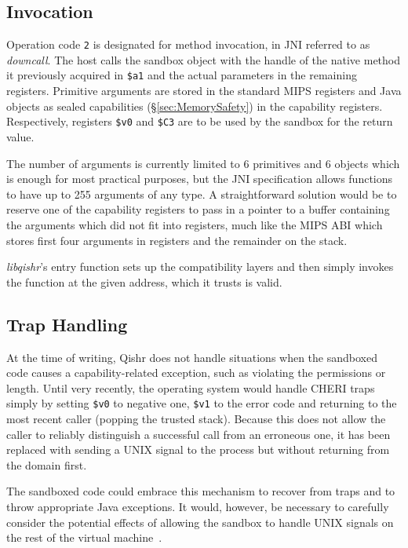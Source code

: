 \documentclass[a4paper,12pt,twoside,openright]{report}
\newcommand{\reg}[1]{\texttt{\$#1}}
\newcommand{\tool}[1]{\emph{#1}}
\newcommand{\lib}[1]{\tool{lib#1}}
\begin{document}
\subsection{Invocation}

Operation code \texttt{2} is designated for method invocation, in JNI referred to as \emph{downcall}. The host calls the sandbox object with the handle of the native method it previously acquired in \reg{a1} and the actual parameters in the remaining registers. Primitive arguments are stored in the standard MIPS registers and Java objects as sealed capabilities (\S\ref{sec:MemorySafety}) in the capability registers. Respectively, registers \reg{v0} and \reg{C3} are to be used by the sandbox for the return value.

The number of arguments is currently limited to 6 primitives and 6 objects which is enough for most practical purposes, but the JNI specification allows functions to have up to 255 arguments of any type. A straightforward solution would be to reserve one of the capability registers to pass in a pointer to a buffer containing the arguments which did not fit into registers, much like the MIPS ABI which stores first four arguments in registers and the remainder on the stack.

\lib{qishr}'s entry function sets up the compatibility layers and then simply invokes the function at the given address, which it trusts is valid. 

\subsection{Trap Handling}

At the time of writing, Qishr does not handle situations when the sandboxed code causes a capability-related exception, such as violating the permissions or length. Until very recently, the operating system would handle CHERI traps simply by setting \reg{v0} to negative one, \reg{v1} to the error code and returning to the most recent caller (popping the trusted stack). Because this does not allow the caller to reliably distinguish a successful call from an erroneous one, it has been replaced with sending a UNIX signal to the process but without returning from the domain first.

The sandboxed code could embrace this mechanism to recover from traps and to throw appropriate Java exceptions. It would, however, be necessary to carefully consider the potential effects of allowing the sandbox to handle UNIX signals on the rest of the virtual machine~\cite{989483}.
\end{document}
